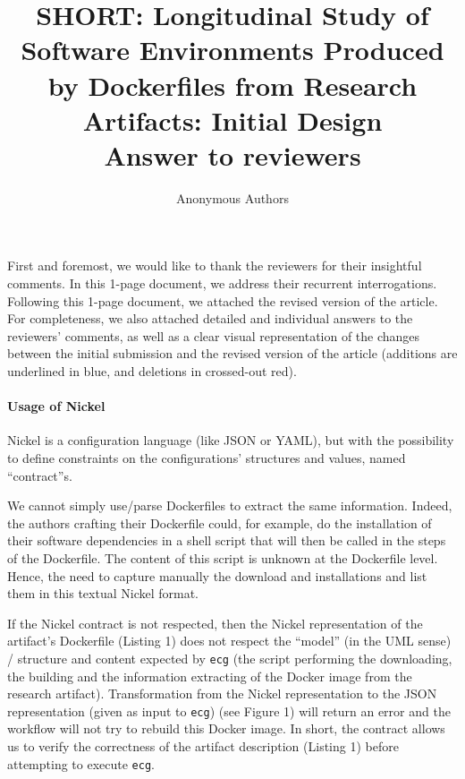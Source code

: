 \documentclass{article}
\title{%
  SHORT: Longitudinal Study of Software Environments Produced by Dockerfiles from Research Artifacts: Initial Design
	\\
	{\Large%
	Answer to reviewers
	}
}
\author{Anonymous Authors}
\date{}
\begin{document}
\maketitle


% 


First and foremost, we would like to thank the reviewers for their insightful comments.
In this 1-page document, we address their recurrent interrogations.
Following this 1-page document, we attached the revised version of the article.
For completeness, we also attached detailed and individual answers to the reviewers' comments, as well as a clear visual representation of the changes between the initial submission and the revised version of the article (additions are underlined in blue, and deletions in crossed-out red).

\paragraph{Usage of Nickel}

Nickel is a configuration language (like JSON or YAML), but with the possibility to define constraints on the configurations' structures and values, named ``contract''s.

We cannot simply use/parse Dockerfiles to extract the same information.
Indeed, the authors crafting their Dockerfile could, for example, do the installation of their software dependencies in a shell script that will then be called in the steps of the Dockerfile.
The content of this script is unknown at the Dockerfile level.
Hence, the need to capture manually the download and installations and list them in this textual Nickel format.


If the Nickel contract is not respected, then the Nickel representation of the artifact's Dockerfile (Listing 1) does not respect the ``model'' (in the UML sense) / structure and content expected by \texttt{ecg} (the script performing the downloading, the building and the information extracting of the Docker image from the research artifact).
Transformation from the Nickel representation to the JSON representation (given as input to \texttt{ecg}) (see Figure 1) will return an error and the workflow will not try to rebuild this Docker image.
In short, the contract allows us to verify the correctness of the artifact description (Listing 1) before attempting to execute \texttt{ecg}.
\end{document}
